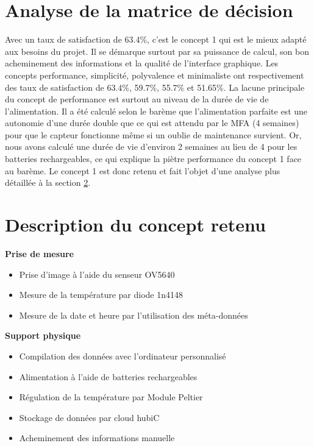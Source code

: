 \section{Analyse de la matrice de décision}

Avec un taux de satisfaction de 63.4\%, c'est le concept 1 qui est le mieux adapté aux besoins du projet. Il se démarque surtout par sa puissance de calcul, son bon acheminement des informations et la qualité de l'interface graphique. Les concepts performance, simplicité, polyvalence et minimaliste ont respectivement des taux de satisfaction de 63.4\%, 59.7\%, 55.7\% et 51.65\%. La lacune principale du concept de performance est surtout au niveau de la durée de vie de l'alimentation. Il a été calculé selon le barème que l'alimentation parfaite est une autonomie d'une durée double que ce qui est attendu par le MFA (4 semaines) pour que le capteur fonctionne même si un oublie de maintenance survient. Or, nous avons calculé une durée de vie d'environ 2 semaines au lieu de 4 pour les batteries rechargeables, ce qui explique la piètre performance du concept 1 face au barème. Le concept 1 est donc retenu et fait l'objet d'une analyse plus détaillée à la section \ref{ch7:concept_retenu}.

\section{Description du concept retenu}
\label{ch7:concept_retenu}

\textbf{Prise de mesure}
\begin{itemize}
    \item Prise d'image à l'aide du senseur OV5640
    \item Mesure de la température par diode 1n4148
    \item Mesure de la date et heure par l'utilisation des méta-données
\end{itemize}

\textbf{Support physique}
\begin{itemize}
    \item Compilation des données avec l'ordinateur personnalisé
    \item Alimentation à l'aide de batteries rechargeables
    \item Régulation de la température par Module Peltier
    \item Stockage de données par cloud hubiC
    \item Acheminement des informations manuelle
\end{itemize}

